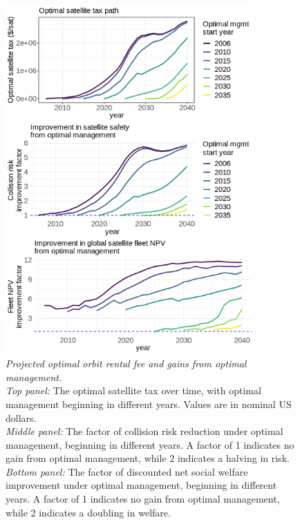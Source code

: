 \documentclass[12pt]{article}
\begin{document}
\begin{figure}[H]
	\centering
	\includegraphics[width=0.85\textwidth]{../../images/7_starts_welfare_and_tax_optstart_2006_remfrac_0_remstart_2030.png}	
	\captionsetup{format=hang}
	\caption[Projected optimal orbit rental fee and gains from optimal management]{\textit{Projected optimal orbit rental fee and gains from optimal management.} \\
		\textit{Top panel:} The optimal satellite tax over time, with optimal management beginning in different years. Values are in nominal US dollars. \\
		\textit{Middle panel:} The factor of collision risk reduction under optimal management, beginning in different years. A factor of 1 indicates no gain from optimal management, while 2 indicates a halving in risk. \\
		\textit{Bottom panel:} The factor of discounted net social welfare improvement under optimal management, beginning in different years. A factor of 1 indicates no gain from optimal management, while 2 indicates a doubling in welfare. \\
	}
	\label{projected_tax_path}
\end{figure}
\end{document}
